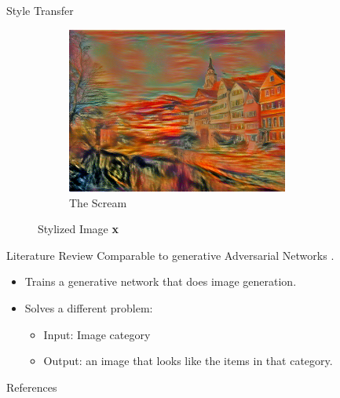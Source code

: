 \documentclass{beamer}
\begin{document}
\begin{frame}{Style Transfer}
\begin{figure}
{\begin{figure}[ht]
    \end{figure}
}{
    \begin{figure}[ht]
    \centering
    \caption*{The Scream}
    \includegraphics[width=0.8\textwidth,height=0.27\textheight]{img/transfer/the-scream}
    \end{figure}
}
\caption*{Stylized Image \textbf{x}}
\end{figure}
\end{frame}



\begin{frame}{Literature Review}
    Comparable to generative Adversarial
    Networks \cite{dosovitskiy2016generating}.
    \begin{itemize}
        \item Trains a generative network
            that does image generation.
        \item Solves a different problem:
            \begin{itemize}
                \item[] Input: Image category
                \item[] Output: an image that looks like
            the items in that category.
            \end{itemize}
    \end{itemize}
\end{frame}



\begin{frame}[allowframebreaks]{References}
    
    
\end{frame}
\end{document}

